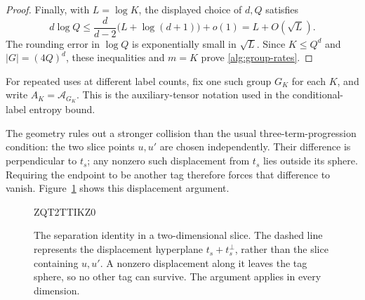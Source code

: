 \documentclass[11pt]{article}
\numberwithin{equation}{section}
\theoremstyle{definition}
\theoremstyle{remark}
\begin{document}
\begin{proof}
Finally, with \(L=\log K\), the displayed choice of \(d,Q\) satisfies
\[
 d\log Q
 \leq\frac{d}{d-2}\bigl(L+\log(d+1)\bigr)+o(1)
 =L+O(\sqrt L).
\]
The rounding error in \(\log Q\) is exponentially small in
\(\sqrt L\).  Since \(K\leq Q^d\) and
\(|G|=(4Q)^d\), these inequalities and \(m=K\) prove
\eqref{alg:group-rates}.
\end{proof}

For repeated uses at different label counts, fix one such group \(G_K\)
for each \(K\), and write \(A_K=\mathcal A_{G_K}\).  This is the
auxiliary-tensor notation used in the conditional-label entropy bound.

The geometry rules out a stronger collision than the usual
three-term-progression condition: the two slice points \(u,u'\) are chosen
independently.  Their difference is perpendicular to \(t_s\); any nonzero
such displacement from \(t_s\) lies outside its sphere.  Requiring the
endpoint to be another tag therefore forces that difference to vanish.
Figure~\ref{fig:group-geometry} shows this displacement argument.

\begin{figure}[H]

ZQT2TTIKZ0
\caption{The separation identity in a two-dimensional slice.
The dashed line represents the displacement hyperplane
\(t_s+t_s^\perp\), rather than the slice containing \(u,u'\).
A nonzero displacement along it leaves the tag sphere, so no other tag
can survive. The argument applies in every dimension.}
\label{fig:group-geometry}
\end{figure}
\end{document}
